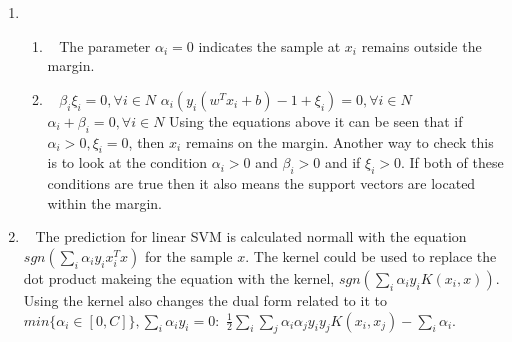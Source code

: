 \documentclass[12pt, fullpage,letterpaper]{article}
\begin{document}
\begin{enumerate}
	
	
	
	\item~
	\begin{enumerate}
		\item~
		\newline The parameter $\alpha_i=0$ indicates the sample at $x_i$ remains outside the margin.
		\item~
		\newline $\beta_i\xi_i=0, \forall i \in N$
		\newline $\alpha_i(y_i(w^Tx_i+b)-1+\xi_i)=0, \forall i \in N$
		\newline $\alpha_i+\beta_i=0, \forall i \in N$
		\newline 
		\newline Using the equations above it can be seen that if $\alpha_i>0, \xi_i=0$, then $x_i$ remains on the margin. Another way to check this is to look at the condition $\alpha_i>0$ and $\beta_i>0$ and if $\xi_i>0$. If both of these conditions are true then it also means the support vectors are located within the margin. 
	\end{enumerate}
	
	
	\item~
	\newline The prediction for linear SVM is calculated normall with the equation $sgn(\sum_i\alpha_iy_ix_i^Tx)$ for the sample $x$. The kernel could be used to replace the dot product makeing the equation with the kernel, $sgn(\sum_i\alpha_iy_iK(x_i,x))$. Using the kernel also changes the dual form related to it to 
	 $min \{\alpha_i \in[0, C]\}, \sum_i\alpha_iy_i=0:$   $\frac{1}{2}\sum_i\sum_j\alpha_i\alpha_jy_iy_jK(x_i, x_j)-\sum_i\alpha_i$.


\end{enumerate}
\end{document}
